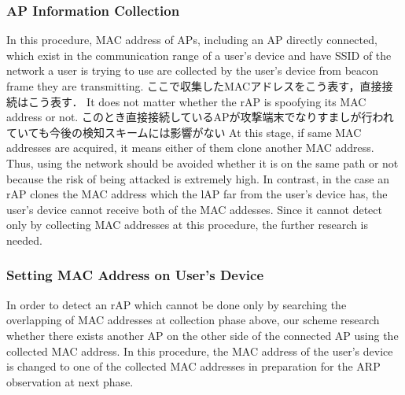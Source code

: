 \documentclass[conference]{IEEEtran}
\begin{document}
\subsubsection{AP Information Collection}
In this procedure, MAC address of APs, including an AP directly connected, which exist in the communication range of a user's device and have SSID of the network a user is trying to use are collected by the user's device from beacon frame they are transmitting.
ここで収集したMACアドレスをこう表す，直接接続はこう表す．
It does not matter whether the rAP is spoofying its MAC address or not.
このとき直接接続しているAPが攻撃端末でなりすましが行われていても今後の検知スキームには影響がない
At this stage, if same MAC addresses are acquired, it means either of them clone another MAC address.
Thus, using the network should be avoided whether it is on the same path or not because the risk of being attacked is extremely high. 
In contrast, in the case an rAP clones the MAC address which the lAP far from the user's device has, the user's device cannot receive both of the MAC addesses.
Since it cannot detect only by collecting MAC addresses at this procedure, the further research is needed.

\subsubsection{Setting MAC Address on User's Device}
In order to detect an rAP which cannot be done only by searching the overlapping of MAC addresses at collection phase above, our scheme research whether there exists another AP on the other side of the connected AP using the collected MAC address.
In this procedure, the MAC address of the user's device is changed to one of the collected MAC addresses in preparation for the ARP observation at next phase.
\end{document}
